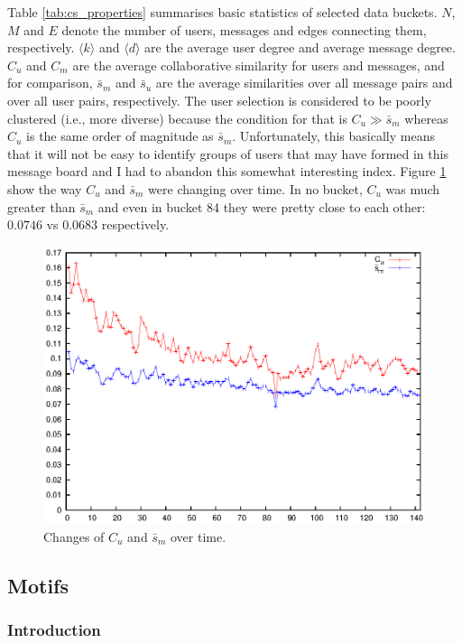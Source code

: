       Table \ref{tab:cs_properties} summarises basic statistics of selected data buckets. $N$, $M$ and $E$ denote the number of users, messages and edges connecting them, respectively. $\langle k \rangle$ and $\langle d \rangle$ are the average user degree and average message degree. $C_u$ and $C_m$ are the average collaborative similarity for users and messages, and for comparison, $\bar s_m$ and $\bar s_u$ are the average similarities over all message pairs and over all user pairs, respectively. The user selection is considered to be poorly clustered (i.e., more diverse) because the condition for that is $C_u \gg \bar s_m$ whereas $C_u$ is the same order of magnitude as $\bar s_m$. Unfortunately, this basically means that it will not be easy to identify groups of users that may have formed in this message board and I had to abandon this somewhat interesting index. Figure \ref{fig:cs_cusm} show the way $C_u$ and $\bar s_m$ were changing over time. In no bucket, $C_u$ was much greater than $\bar s_m$ and even in bucket 84 they were pretty close to each other: $0.0746$ vs $0.0683$ respectively.
      \begin{figure}[H]
        \includegraphics[width=\textwidth]{chapters/03_implementation/C_us_m}
        \caption{Changes of $C_u$ and $\bar s_m$ over time.}
        \label{fig:cs_cusm}
      \end{figure}

  \subsection{Motifs}
  
    \subsubsection{Introduction}
      

